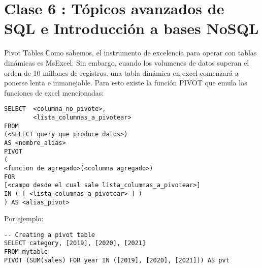 \hypertarget{clase-6-tuxf3picos-avanzados-de-sql-e-introducciuxf3n-a-bases-nosql}{%
\section{Clase 6 : Tópicos avanzados de SQL e Introducción a bases
NoSQL}\label{clase-6-tuxf3picos-avanzados-de-sql-e-introducciuxf3n-a-bases-nosql}}

\begin{frame}[fragile]{Pivot Tables}
\protect\hypertarget{pivot-tables}{}
Como sabemos, el instrumento de excelencia para operar con tablas
dinámicas es MsExcel. Sin embargo, cuando los volumenes de datos superan
el orden de 10 millones de registros, una tabla dinámica en excel
comenzará a ponerse lenta e inmanejable. Para esto existe la función
PIVOT que emula las funciones de excel mencionadas:

\begin{verbatim}
SELECT  <columna_no_pivote>,
        <lista_columnas_a_pivotear>
FROM
(<SELECT query que produce datos>)
AS <nombre_alias>
PIVOT
(
<funcion de agregado>(<columna agregado>)
FOR
[<campo desde el cual sale lista_columnas_a_pivotear>]
IN ( [ <lista_columnas_a_pivotear> ] )
) AS <alias_pivot>
\end{verbatim}

Por ejemplo:

\begin{verbatim}
-- Creating a pivot table
SELECT category, [2019], [2020], [2021]
FROM mytable
PIVOT (SUM(sales) FOR year IN ([2019], [2020], [2021])) AS pvt
\end{verbatim}
\end{frame}

